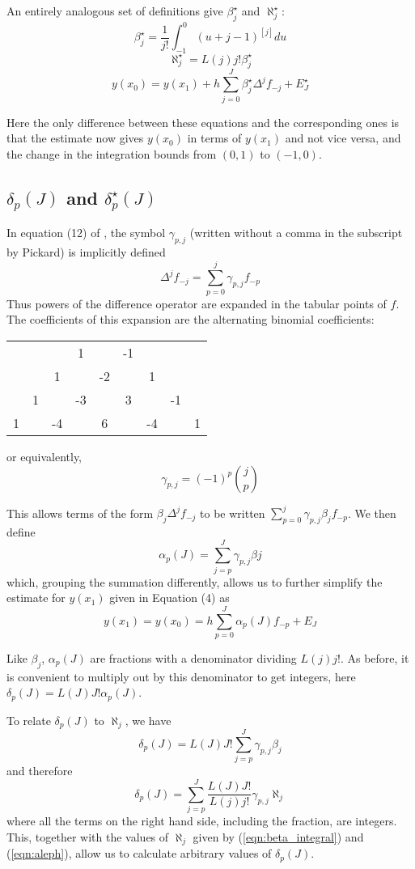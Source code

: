\documentclass{article}
\begin{document}
An entirely analogous set of definitions give $\beta^{\star}_j$ and $\aleph^{\star}_j$:
\[ \beta^{\star}_j = \frac{1}{j!}\int_{-1}^0 (u + j - 1)^{[j]} du \]
\[ \aleph^{\star}_j = L(j)j!\beta^{\star}_j \]
\[ y(x_0) = y(x_1) + h\sum_{j=0}^{J} \beta^{\star}_j \Delta^{j}f_{-j} + E^{\star}_{J} \]

Here the only difference between these equations and the corresponding ones is that the estimate now gives $y(x_0)$ in terms of $y(x_1)$ and not vice versa, and the change in the integration bounds from $(0, 1)$ to $(-1, 0)$.

\subsection{$\delta_p(J)$ and $\delta^{\star}_p(J)$}
In equation (12) of \cite{pickard}, the symbol $\gamma_{p,j}$ (written without a comma in the subscript by Pickard) is implicitly defined
\[ \Delta^{j}f_{-j}  = \sum_{p=0}^{j} \gamma_{p,j}f_{-p} \]
Thus powers of the difference operator are expanded in the tabular points of $f$.
The coefficients of this expansion are the alternating binomial coefficients:

\begin{center}
\begin{tabular}{ccccccccc}
&&&1&&-1&&&\\
&&1&&-2&&1&&\\
&1&&-3&&3&&-1&\\
1&&-4&&6&&-4&&1\\
\end{tabular}
\end{center}
or equivalently,
\[ \gamma_{p, j} = (-1)^{p} {j \choose p} \]

This allows terms of the form $\beta_j \Delta^{j}f_{-j}$ to be written $\sum_{p=0}^{j} \gamma_{p, j} \beta_{j} f_{-p}$.
We then define 
\[ \alpha_p(J) = \sum_{j=p}^{J} \gamma_{p, j} \beta{j} \]
which, grouping the summation differently, allows us to further simplify the estimate for $y(x_1)$ given in Equation (4) as
\[ y(x_1) = y(x_0) = h\sum_{p=0}^{J} \alpha_{p}(J)f_{-p} + E_{J} \]

Like $\beta_{j}$, $\alpha_{p}(J)$ are fractions with a denominator dividing $L(j)j!$.
As before, it is convenient to multiply out by this denominator to get integers, here $\delta_p(J) = L(J)J! \alpha_p(J)$.

To relate $\delta_p(J)$ to $\aleph_j$, we have
\[ \delta_p(J) = L(J)J! \sum_{j=p}^{J} \gamma_{p, j} \beta_{j} \]
and therefore
\[ \delta_p(J) = \sum_{j=p}^{J} \frac{L(J)J!}{L(j)j!} \gamma_{p, j} \aleph_{j} \]
where all the terms on the right hand side, including the fraction, are integers.
This, together with the values of $\aleph_{j}$ given by (\ref{eqn:beta_integral}) and (\ref{eqn:aleph}), allow us to calculate arbitrary values of $\delta_p(J)$.
\end{document}
